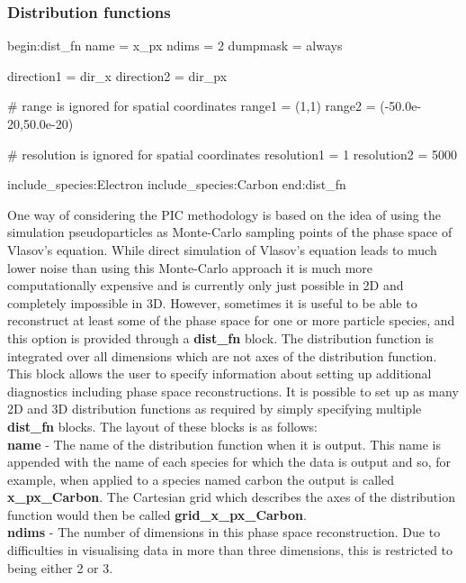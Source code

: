 \documentclass[12pt,a4paper]{article}
\newcommand{\emphtext}{\color{warwickdark} \fontfamily{phv}\selectfont\large\bf}
\newcommand{\inlineemph}[1]{{\color{warwicklight} \bf{#1}}}
\newenvironment{nbboxverbatim}[1]{
\noindent\minipage{\textwidth}
\setlength{\FrameSep}{0pt}
\def\FrameCommand{\fboxsep=0pt \colorbox{shadecolor}}
\MakeFramed{\FrameRestore}
\fvset{label=#1}
\boxverb
}{
\endboxverb
\vspace{-13.5pt}
\endMakeFramed
\endminipage
\vspace{5pt}
}
\begin{document}
\subsubsection{Distribution functions}
%
\begin{nbboxverbatim}{dist\_fn block}
begin:dist_fn
   name = x_px
   ndims = 2
   dumpmask = always

   direction1 = dir_x
   direction2 = dir_px

   # range is ignored for spatial coordinates
   range1 = (1,1)
   range2 = (-50.0e-20,50.0e-20)

   # resolution is ignored for spatial coordinates
   resolution1 = 1
   resolution2 = 5000

   include_species:Electron
   include_species:Carbon
end:dist_fn
\end{nbboxverbatim}

One way of considering the PIC methodology is based on the idea of using the
simulation pseudoparticles as Monte-Carlo sampling points of the phase space
of Vlasov's equation. While direct simulation of Vlasov's equation leads to
much lower noise than using this Monte-Carlo approach it is much more
computationally expensive and is currently only just possible in 2D and
completely impossible in 3D. However, sometimes it is useful to be able to
reconstruct at least some of the phase space for one or more particle species,
and this option is provided through a \inlineemph{dist\_fn} block. The
distribution function is integrated over all dimensions which are not axes of
the distribution function.\\

This block allows the user to specify information about
setting up additional diagnostics including phase space reconstructions. It is
possible to set up as many 2D and 3D distribution functions as required by
simply specifying multiple \inlineemph{dist\_fn} blocks. The layout of these
blocks is as follows:\\

{\emphtext name} - The name of the distribution function when it is
output. This name is appended with the name of each species for which the data
is output and so, for example, when applied to a species named
carbon the output is called \inlineemph{x\_px\_Carbon}. The Cartesian grid
which describes the axes of the distribution function would then be called
\inlineemph{grid\_x\_px\_Carbon}.\\

{\emphtext ndims} - The number of dimensions in this phase space
reconstruction. Due to difficulties in visualising data in more than three
dimensions, this is restricted to being either 2 or 3.\\
\end{document}
